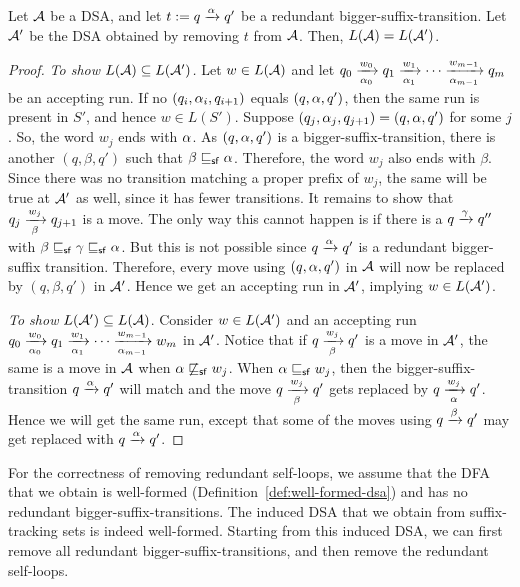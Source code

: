 \begin{lemma}
  \label{lem:bigger-suffix-transitions-redundant}
  Let $\mathcal{A}$ be a DSA, and let $t:= q \xrightarrow{\alpha} q'$ be a redundant
  bigger-suffix-transition. Let $\mathcal{A}'$ be the DSA obtained by removing
  $t$ from $\mathcal{A}$. Then, $L(\mathcal{A}) = L(\mathcal{A}')$.
\end{lemma}
\begin{proof} 
  
 \emph{To show $L(\mathcal{A}) \subseteq L(\mathcal{A}')$.} Let $w \in L(\mathcal{A})$ and let
  $q_0 \xrightarrow[\alpha_0]{w_0} q_1 \xrightarrow[\alpha_1]{w_1} \cdots
  \xrightarrow[\alpha_{m-1}]{w_{m-1}} q_m$ be an accepting run. If no
  $(q_i, \alpha_i, q_{i+1})$ equals $(q, \alpha, q')$, then the same run is
  present in $S'$, and hence $w \in L(S')$. Suppose
  $(q_j, \alpha_j, q_{j+1}) = (q, \alpha, q')$ for some $j$. So, the word
  $w_{j}$ ends with $\alpha$. As $(q, \alpha, q')$ is a
  bigger-suffix-transition, there is another $(q, \beta, q')$ such that
  $\beta \sqsubseteq_{\mathsf {sf}} \alpha$. Therefore, the word $w_j$ also ends with $\beta$. Since
  there was no transition matching a proper prefix of $w_j$, the same
  will be true at $\mathcal{A}'$ as well, since it has fewer transitions. It
  remains to show that $q_j \xrightarrow[\beta]{w_j} q_{j+1}$ is a move. The only
  way this cannot happen is if there is a $q \xrightarrow{\gamma} q''$ with
  $\beta \sqsubseteq_{\mathsf {sf}} \gamma \sqsubseteq_{\mathsf {sf}} \alpha$. But this is not possible since
  $q \xrightarrow{\alpha} q'$ is a redundant bigger-suffix transition. Therefore,
  every move using $(q, \alpha, q')$ in $\mathcal{A}$ will now be replaced by
  $(q, \beta, q')$ in $\mathcal{A}'$. Hence we get an accepting run in $\mathcal{A}'$,
  implying $w \in L(\mathcal{A}')$.

  \emph{To show $L(\mathcal{A}') \subseteq L(\mathcal{A})$}. Consider $w \in L(\mathcal{A}')$ and
  an accepting run
  $q_0 \xrightarrow[\alpha_0]{w_0} q_1 \xrightarrow[\alpha_1]{w_1} \cdots
  \xrightarrow[\alpha_{m-1}]{w_{m-1}} w_m$ in $\mathcal{A}'$. Notice that if
  $q \xrightarrow[\beta]{w_j} q'$ is a move in $\mathcal{A}'$, the same is a move in
  $\mathcal{A}$ when $\alpha \not\sqsubseteq_{\mathsf {sf}} w_j$. When $\alpha \sqsubseteq_{\mathsf {sf}} w_j$, then the
  bigger-suffix-transition $q \xrightarrow{\alpha} q'$ will match and the move $q
  \xrightarrow[\beta]{w_j} q'$ 
  gets replaced by $q \xrightarrow[\alpha]{w_j} q'$. Hence we will get the same
  run, except that some of the moves using $q \xrightarrow{\beta} q'$ may get
  replaced with $q \xrightarrow{\alpha} q'$.
\end{proof}

For the correctness of removing redundant self-loops, we assume that the
DFA that we obtain is well-formed
(Definition~\ref{def:well-formed-dsa}) and has no redundant
bigger-suffix-transitions. The induced DSA that we obtain from
suffix-tracking sets is indeed well-formed. Starting from this induced
DSA, we can first remove all redundant bigger-suffix-transitions, and
then remove the redundant self-loops.

